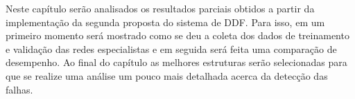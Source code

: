 \label{cap:resultados}



% 
%
%

Neste capítulo serão analisados os resultados parciais obtidos a partir da
implementação da segunda proposta do sistema de DDF. Para isso, em um primeiro
momento será mostrado como se deu a coleta dos dados de treinamento e validação
das redes especialistas e em seguida será feita uma comparação de desempenho. Ao
final do capítulo as melhores estruturas serão selecionadas para que se realize
uma análise um pouco mais detalhada acerca da detecção das falhas.


